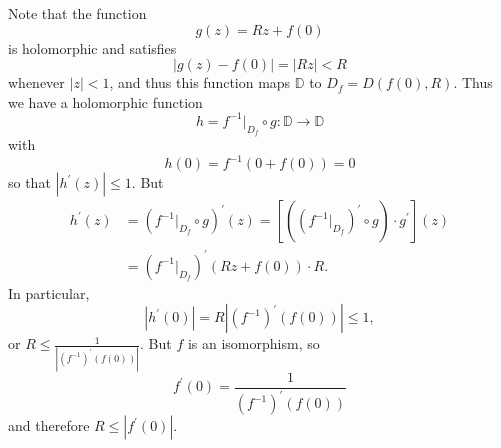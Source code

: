 \documentclass{article}
\begin{document}
\begin{Answer}
Note that the function
$$
g(z) = R z + f(0)
$$
is holomorphic and satisfies
$$
  |g(z) - f(0)|
= |Rz|
< R
$$
whenever $|z| < 1$, and thus this function maps $\mathbb{D}$ to
$D_f = D(f(0), R)$. Thus we have a holomorphic function
$$
h = f^{-1} \big|_{D_f} \circ g : \mathbb{D} \to \mathbb{D}
$$
with
$$
  h(0)
= f^{-1}(0 + f(0))
= 0
$$
so that $|h^\prime(z)| \leq 1$. But
\begin{align*}
   h^\prime(z)
&= (f^{-1}\big|_{D_f} \circ g)^\prime(z)
 = [ ((f^{-1}\big|_{D_f})^\prime
     \circ g)
     \cdot g^\prime](z) \\
&= (f^{-1}\big|_{D_f})^\prime(Rz + f(0)) \cdot R.
\end{align*}
In particular,
$$
     |h^\prime(0)|
=    R |(f^{-1})^\prime(f(0))|
\leq 1,
$$
or $R \leq \frac{1}{|(f^{-1})^\prime(f(0))|}$.
But $f$ is an isomorphism, so
$$
  f^\prime(0)
= \frac{1}{(f^{-1})^\prime(f(0))}
$$
and therefore $R \leq |f^\prime(0)|$.
\end{Answer}
\end{document}
